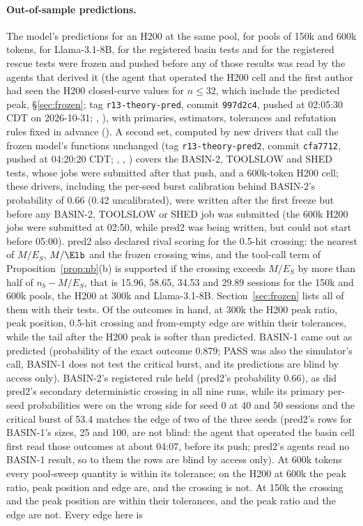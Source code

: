 \paragraph{Out-of-sample predictions.} The model's predictions for an H200 at the same pool, for pools of 150k and 600k tokens, for Llama-3.1-8B, for the registered basin tests and for the registered rescue tests were frozen and pushed before any of those results was read by the agents that derived it (the agent that operated the H200 cell and the first author had seen the H200 closed-curve values for $n\le32$, which include the predicted peak, \S\ref{sec:frozen}; tag \texttt{r13-theory-pred}, commit \texttt{997d2c4}, pushed at 02:05:30 CDT on 2026-10-31; , ), with primaries, estimators, tolerances and refutation rules fixed in advance (). A second set, computed by new drivers that call the frozen model's functions unchanged (tag \texttt{r13-theory-pred2}, commit \texttt{cfa7712}, pushed at 04:20:20 CDT; , , ) covers the BASIN-2, TOOLSLOW and SHED tests, whose jobs were submitted after that push, and a 600k-token H200 cell; these drivers, including the per-seed burst calibration behind BASIN-2's probability of 0.66 (0.42 uncalibrated), were written after the first freeze but before any BASIN-2, TOOLSLOW or SHED job was submitted (the 600k H200 jobs were submitted at 02:50, while pred2 was being written, but could not start before 05:00). pred2 also declared rival scoring for the 0.5-hit crossing: the nearest of $M/E_S$, $M/\Elb$ and the frozen crossing wins, and the tool-call term of Proposition~\ref{prop:nb}(b) is supported if the crossing exceeds $M/E_S$ by more than half of $n_b-M/E_S$, that is 15.96, 58.65, 34.53 and 29.89 sessions for the 150k and 600k pools, the H200 at 300k and Llama-3.1-8B. Section~\ref{sec:frozen} lists all of them with their tests. Of the outcomes in hand, at 300k the H200 peak ratio, peak position, 0.5-hit crossing and from-empty edge are within their tolerances, while the tail after the H200 peak is softer than predicted. BASIN-1 came out as predicted (probability of the exact outcome 0.879; PASS was also the simulator's call, BASIN-1 does not test the critical burst, and its predictions are blind by access only). BASIN-2's registered rule held (pred2's probability 0.66), as did pred2's secondary deterministic crossing in all nine runs, while its primary per-seed probabilities were on the wrong side for seed 0 at 40 and 50 sessions and the critical burst of 53.4 matches the edge of two of the three seeds (pred2's rows for BASIN-1's sizes, 25 and 100, are not blind: the agent that operated the basin cell first read those outcomes at about 04:07, before its push; pred2's agents read no BASIN-1 result, so to them the rows are blind by access only). At 600k tokens every pool-sweep quantity is within its tolerance; on the H200 at 600k the peak ratio, peak position and edge are, and the crossing is not. At 150k the crossing and the peak position are within their tolerances, and the peak ratio and the edge are not. Every edge here is 